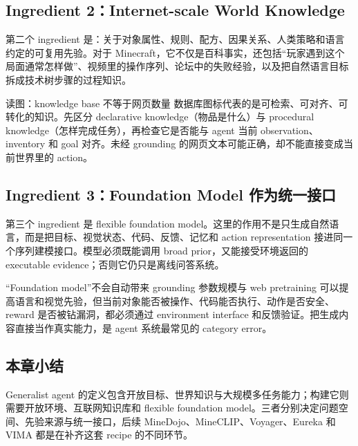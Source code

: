 \subsection{Ingredient 2：Internet-scale World Knowledge}

第二个 ingredient 是：关于对象属性、规则、配方、因果关系、人类策略和语言约定的可复用先验。对于 Minecraft，它不仅是百科事实，还包括“玩家遇到这个局面通常怎样做”、视频里的操作序列、论坛中的失败经验，以及把自然语言目标拆成技术树步骤的过程知识。


\begin{knowledgebox}{读图：knowledge base 不等于网页数量}
数据库图标代表的是可检索、可对齐、可转化的知识。先区分 declarative knowledge（物品是什么）与 procedural knowledge（怎样完成任务），再检查它是否能与 agent 当前 observation、inventory 和 goal 对齐。未经 grounding 的网页文本可能正确，却不能直接变成当前世界里的 action。
\end{knowledgebox}

\subsection{Ingredient 3：Foundation Model 作为统一接口}

第三个 ingredient 是 flexible foundation model。这里的作用不是只生成自然语言，而是把目标、视觉状态、代码、反馈、记忆和 action representation 接进同一个序列建模接口。模型必须既能调用 broad prior，又能接受环境返回的 executable evidence；否则它仍只是离线问答系统。


\begin{warningbox}{“Foundation model”不会自动带来 grounding}
参数规模与 web pretraining 可以提高语言和视觉先验，但当前对象能否被操作、代码能否执行、动作是否安全、reward 是否被钻漏洞，都必须通过 environment interface 和反馈验证。把生成内容直接当作真实能力，是 agent 系统最常见的 category error。
\end{warningbox}

\subsection{本章小结}

Generalist agent 的定义包含开放目标、世界知识与大规模多任务能力；构建它则需要开放环境、互联网知识库和 flexible foundation model。三者分别决定问题空间、先验来源与统一接口，后续 MineDojo、MineCLIP、Voyager、Eureka 和 VIMA 都是在补齐这套 recipe 的不同环节。

